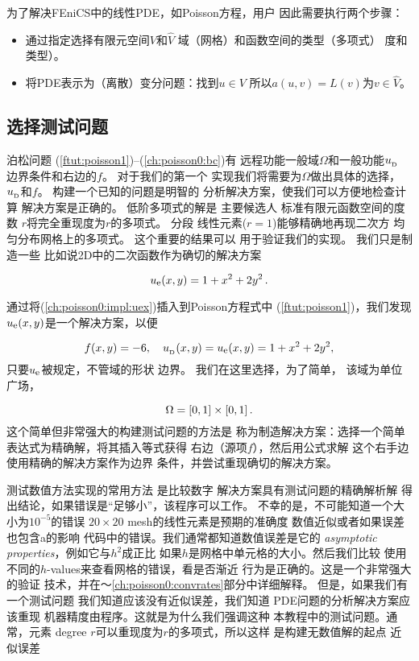为了解决FEniCS中的线性PDE，如Poisson方程，用户
因此需要执行两个步骤：

\begin{itemize}
\item 通过指定选择有限元空间$V$和$\hat V$
域（网格）和函数空间的类型（多项式）
度和类型）。
\item 将PDE表示为（离散）变分问题：找到$u\in V$
所以$a(u,v) = L(v)$为$v\in \hat{V}$。
\end{itemize}

\noindent
\subsection{选择测试问题}
\label{ch:poisson0:testproblem}

泊松问题 (\ref{ftut:poisson1})--(\ref{ch:poisson0:bc})有
远程功能一般域$\Omega$和一般功能$\ub$
边界条件和右边的$f$。 对于我们的第一个
实现我们将需要为$\Omega$做出具体的选择，
$\ub$和$f$。 构建一个已知的问题是明智的
分析解决方案，使我们可以方便地检查计算
解决方案是正确的。 低阶多项式的解是
主要候选人 标准有限元函数空间的度数
$r$将完全重现度为$r$的多项式。 分段
线性元素($r = 1$)能够精确地再现二次方
均匀分布网格上的多项式。 这个重要的结果可以
用于验证我们的实现。 我们只是制造一些
比如说2D中的二次函数作为确切的解决方案


\begin{equation}
\label{ch:poisson0:impl:uex}
\uex(x,y) = 1 +x^2 + 2y^2\tp
\end{equation}

通过将(\ref{ch:poisson0:impl:uex})插入到Poisson方程式中
(\ref{ftut:poisson1})，我们发现$\uex(x,y)$是一个解决方案，以便

\[ f(x,y) = -6,\quad \ub(x,y)=\uex(x,y)=1 + x^2 + 2y^2,\]
只要$\uex$被规定，不管域的形状
边界。 我们在这里选择，为了简单，
该域为单位广场，

\[ \Omega = [0,1]\times [0,1] \tp\]
这个简单但非常强大的构建测试问题的方法是
称为制造解决方案：选择一个简单
表达式为精确解，将其插入等式获得
右边（源项$f$），然后用公式求解
这个右手边使用精确的解决方案作为边界
条件，并尝试重现确切的解决方案。


\begin{notice}[提示:尝试使用精确的数值解决方案验证您的代码!]
测试数值方法实现的常用方法
是比较数字
解决方案具有测试问题的精确解析解
得出结论，如果错误是“足够小”，该程序可以工作。
不幸的是，不可能知道一个大小为$10^{ - 5}$的错误
$20\times 20$ mesh的线性元素是预期的准确度
数值近似或者如果误差也包含a的影响
代码中的错误。我们通常都知道数值误差是它的
\emph{asymptotic properties}，例如它与$h^2$成正比
如果$h$是网格中单元格的大小。然后我们比较
使用不同的$h$-values来查看网格的错误，看是否渐近
行为是正确的。这是一个非常强大的验证
技术，并在〜\ref{ch:poisson0:convrates}部分中详细解释。
但是，如果我们有一个测试问题
我们知道应该没有近似误差，我们知道
PDE问题的分析解决方案应该重现
机器精度由程序。这就是为什么我们强调这种
本教程中的测试问题。通常，元素
degree $r$可以重现度为$r$的多项式，所以这样
是构建无数值解的起点
近似误差
\end{notice}

